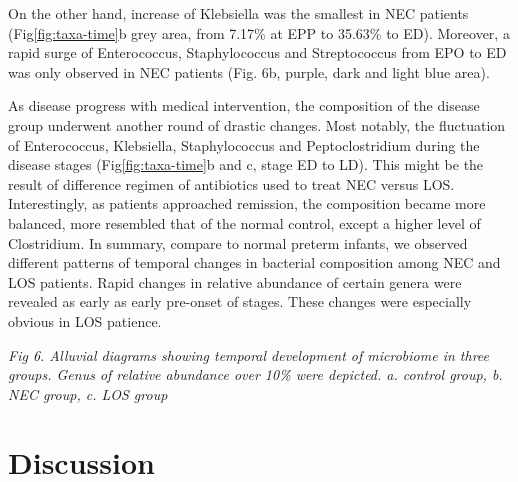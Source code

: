 \documentclass[fleqn,10pt]{wlpeerj} %
\begin{document}
  	On the other hand, increase of Klebsiella was the smallest  in NEC patients (Fig\ref{fig:taxa-time}b grey area, from 7.17\% at EPP to 35.63\% to ED).  Moreover, a rapid surge of Enterococcus, Staphylococcus and Streptococcus from EPO to ED was only observed in NEC patients (Fig. 6b, purple, dark and light blue area).

  	As disease progress with medical intervention, the composition of the disease group underwent another round of drastic changes.  Most notably, the fluctuation of Enterococcus, Klebsiella, Staphylococcus and Peptoclostridium during the disease stages (Fig\ref{fig:taxa-time}b and c, stage ED to LD).  This might be the result of difference regimen of antibiotics used to treat NEC versus LOS.  Interestingly, as patients approached remission, the composition became more balanced, more resembled that of the normal control, except a higher level of Clostridium.  In summary, compare to normal preterm infants, we observed different patterns of temporal changes in bacterial composition among NEC and LOS patients.  Rapid changes in relative abundance of certain genera were revealed as early as early pre-onset of stages.  These changes were especially obvious in LOS patience.

  \textit{Fig 6. Alluvial diagrams showing temporal development of microbiome in three groups. Genus of relative abundance over 10\% were depicted. a. control group, b. NEC group, c. LOS group}


\section*{Discussion}
\end{document}
